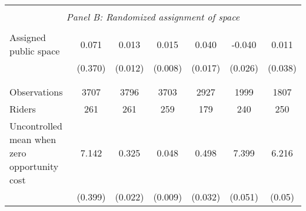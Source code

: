 \begin{tabular}{l*{6}{c}}
\hline \\[-1ex] \multicolumn{7}{c}{\textit{Panel B: Randomized assignment of space}} \\\\[-1ex]
Assigned public space&       0.071         &       0.013         &       0.015\sym{**} &       0.040\sym{**} &      -0.040         &       0.011         \\
                    &     (0.370)         &     (0.012)         &     (0.008)         &     (0.017)         &     (0.026)         &     (0.038)         \\
\\[-1.8ex] \hline \\[-1.8ex]  
Observations        &        3707         &        3796         &        3703         &        2927         &        1999         &        1807         \\
Riders              &         261         &         261         &         259         &         179         &         240         &         250         \\
Uncontrolled mean when zero opportunity cost&       7.142         &       0.325         &       0.048         &       0.498         &       7.399         &       6.216         \\
\,                  &     (0.399)         &     (0.022)         &     (0.009)         &     (0.032)         &     (0.051)         &      (0.05)         \\
\hline\hline \end{tabular}
